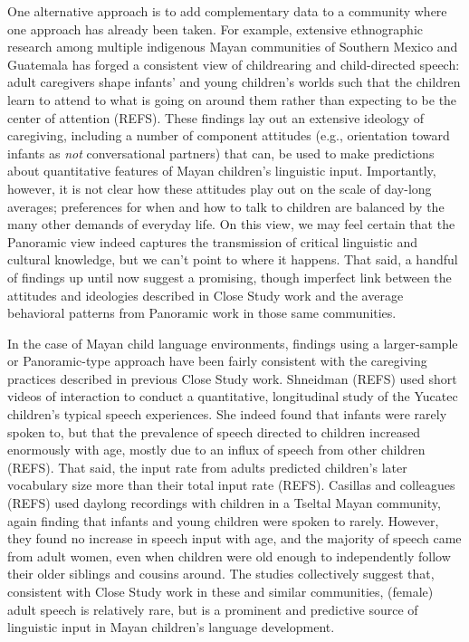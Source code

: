 \documentclass[,man,floatsintext]{apa6}
\begin{document}
One alternative approach is to add complementary data to a community
where one approach has already been taken. For example, extensive
ethnographic research among multiple indigenous Mayan communities of
Southern Mexico and Guatemala has forged a consistent view of
childrearing and child-directed speech: adult caregivers shape infants'
and young children's worlds such that the children learn to attend to
what is going on around them rather than expecting to be the center of
attention (REFS). These findings lay out an extensive ideology of
caregiving, including a number of component attitudes (e.g., orientation
toward infants as \emph{not} conversational partners) that can, be used
to make predictions about quantitative features of Mayan children's
linguistic input. Importantly, however, it is not clear how these
attitudes play out on the scale of day-long averages; preferences for
when and how to talk to children are balanced by the many other demands
of everyday life. On this view, we may feel certain that the Panoramic
view indeed captures the transmission of critical linguistic and
cultural knowledge, but we can't point to where it happens. That said, a
handful of findings up until now suggest a promising, though imperfect
link between the attitudes and ideologies described in Close Study work
and the average behavioral patterns from Panoramic work in those same
communities.

In the case of Mayan child language environments, findings using a
larger-sample or Panoramic-type approach have been fairly consistent
with the caregiving practices described in previous Close Study work.
Shneidman (REFS) used short videos of interaction to conduct a
quantitative, longitudinal study of the Yucatec children's typical
speech experiences. She indeed found that infants were rarely spoken to,
but that the prevalence of speech directed to children increased
enormously with age, mostly due to an influx of speech from other
children (REFS). That said, the input rate from adults predicted
children's later vocabulary size more than their total input rate
(REFS). Casillas and colleagues (REFS) used daylong recordings with
children in a Tseltal Mayan community, again finding that infants and
young children were spoken to rarely. However, they found no increase in
speech input with age, and the majority of speech came from adult women,
even when children were old enough to independently follow their older
siblings and cousins around. The studies collectively suggest that,
consistent with Close Study work in these and similar communities,
(female) adult speech is relatively rare, but is a prominent and
predictive source of linguistic input in Mayan children's language
development.
\end{document}
